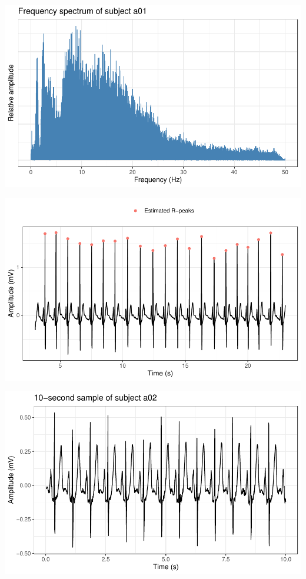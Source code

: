 \documentclass[
]{article}
\begin{document}
\begin{center}\includegraphics{report_files/figure-latex/rr-interval-2} \end{center}

\begin{center}\includegraphics{report_files/figure-latex/rr-interval-3} \end{center}

\begin{center}\includegraphics{report_files/figure-latex/rr-interval-4} \end{center}
\end{document}
